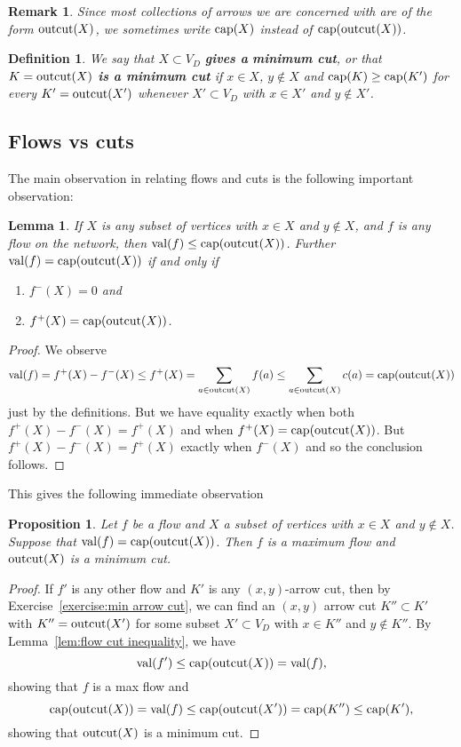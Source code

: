 \documentclass[12pt]{report}
\theoremstyle{plain}
\newtheorem{defn}[thm]{Definition}
\newtheorem{lem}[thm]{Lemma}
\newtheorem{rem}[thm]{Remark}
\newtheorem{prop}[thm]{Proposition}
\newcommand{\Xb}[1]{\textbf{#1}\index{#1}}
\begin{document}
\begin{rem}
Since most collections of arrows we are concerned with are of the form
$\operatorname{outcut}(X)$, we sometimes write $\operatorname{cap}(X)$ instead of
$\operatorname{cap}(\operatorname{outcut}(X))$.
\end{rem}

\begin{defn}
We say that $X \subset V_D$ \textbf{gives a} \Xb{minimum cut}, or that $K =
\operatorname{outcut}(X)$ \textbf{is a minimum cut} if $x \in X$, $y \not\in X$ and
$\operatorname{cap}(K) \geq \operatorname{cap}(K')$ for every $K' =  \operatorname{outcut}(X')$ whenever
$X' \subset V_D$ with $x \in X'$ and $y \not\in X'$.
\end{defn}

\subsection{Flows vs cuts}

The main observation in relating flows and cuts is the following important
observation: 

\begin{lem} \label{lem:flow cut inequality}
If $X$ is any subset of vertices with $x \in X$ and $y \not\in
X$, and $f$ is any flow on the network, then $\operatorname{val}(f) \leq
\operatorname{cap}(\operatorname{outcut}(X))$.
Further $\operatorname{val}(f) = \operatorname{cap}(\operatorname{outcut}(X))$ if and only if
\begin{enumerate}[ 1. ]
\item $f^-(X) = 0$ and
\item $f^+(X) = \operatorname{cap}(\operatorname{outcut}(X))$.
\end{enumerate}
\end{lem}
\begin{proof}
We observe
\[\operatorname{val}(f) = f^+(X) - f^-(X) \leq f^+(X) = \sum_{a \in \operatorname{outcut}(X)} f(a) \leq
\sum_{a \in \operatorname{outcut}(X)} c(a) = \operatorname{cap}(\operatorname{outcut}(X)) \]
just by the definitions. But we have equality exactly when both $f^+(X) -
f^-(X) = f^+(X)$ and when $f^+(X) = \operatorname{cap}(\operatorname{outcut}(X))$. But $f^+(X) - f^-(X) =
f^+(X)$ exactly when $f^-(X)$ and so the conclusion follows.
\end{proof}

This gives the following immediate observation
\begin{prop} \label{prop:min cut max flow}
Let $f$ be a flow and $X$ a subset of vertices with $x \in X$ and $y
\not\in X$. Suppose that $\operatorname{val}(f) = \operatorname{cap}(\operatorname{outcut}(X))$. Then $f$ is a
maximum flow and $\operatorname{outcut}(X)$ is a minimum cut.
\end{prop}
\begin{proof}
If $f'$ is any other flow and $K'$ is any $(x,y)$-arrow cut, then by
Exercise~\ref{exercise:min arrow cut}, we can find an $(x, y)$ arrow
cut $K'' \subset K'$ with $K'' = \operatorname{outcut}(X')$ for some subset $X' \subset
V_D$ with $x \in K''$ and $y \not\in K''$. By Lemma~\ref{lem:flow cut
inequality}, we have
\[\operatorname{val}(f') \leq \operatorname{cap}(\operatorname{outcut}(X)) = \operatorname{val}(f),\]
showing that $f$ is a max flow and
\[\operatorname{cap}(\operatorname{outcut}(X)) = \operatorname{val}(f) \leq \operatorname{cap}(\operatorname{outcut}(X')) =
\operatorname{cap}(K'') \leq
\operatorname{cap}(K'),\] showing that $\operatorname{outcut}(X)$ is a minimum cut.
\end{proof}
\end{document}
